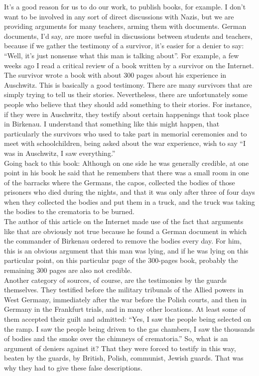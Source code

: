 It's a good reason for us to do our work, to publish books, for example. I don’t want to be involved in any sort of direct discussions with Nazis, but we are providing arguments for many teachers, arming them with documents. German documents, I'd say, are more useful in discussions between students and teachers, because if we gather the testimony of a survivor, it’s easier for a denier to say: ``Well, it’s just nonsense what this man is talking about''. For example, a few weeks ago I read a critical review of a book written by a survivor on the Internet. The survivor wrote a book with about 300 pages about his experience in Auschwitz. This is basically a good testimony. There are many survivors that are simply trying to tell us their stories. Nevertheless, there are unfortunately some people who believe that they should add something to their stories. For instance, if they were in Auschwitz, they testify about certain happenings that took place in Birkenau. I understand that something like this might happen, that particularly the survivors who used to take part in memorial ceremonies and to meet with schoolchildren, being asked about the war experience, wish to say ``I was in Auschwitz, I saw everything.''\\
Going back to this book: Although on one side he was generally credible, at one point in his book he said that he remembers that there was a small room in one of the barracks where the Germans, the capos, collected the bodies of those prisoners who died during the nights, and that it was only after three of four days when they collected the bodies and put them in a truck, and the truck was taking the bodies to the crematoria to be burned.\\
The author of this article on the Internet made use of the fact that arguments like that are obviously not true because he found a German document in which the commander of Birkenau ordered to remove the bodies every day. For him, this is an obvious argument that this man was lying, and if he was lying on this particular point, on this particular page of the 300-pages book, probably the remaining 300 pages are also not credible.\\
Another category of sources, of course, are the testimonies by the guards themselves. They testified before the military tribunals of the Allied powers in West Germany, immediately after the war before the Polish courts, and then in Germany in the Frankfurt trials, and in many other locations. At least some of them accepted their guilt and admitted: ``Yes, I saw the people being selected on the ramp. I saw the people being driven to the gas chambers, I saw the thousands of bodies and the smoke over the chimneys of crematoria.'' So, what is an argument of deniers against it? That they were forced to testify in this way, beaten by the guards, by British, Polish, communist, Jewish guards. That was why they had to give these false descriptions. \\
